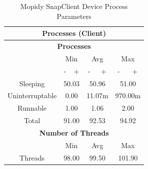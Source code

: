 \documentclass[11pt,a4paper,headinclude=false,footinclude=false]{scrreprt}
\begin{document}
\begin{table}[H]
\centering
    \begin{tabular}{||c|c|c|c|c|c|c||}
    \hline
    \multicolumn{7}{|c|}{\textbf{Processes (Client)}} \\
    \hline
    \multicolumn{7}{|c|}{\textbf{Processes}} \\
    \hline\hline
      & \multicolumn{2}{|c|}{Min} & \multicolumn{2}{|c|}{Avg} & \multicolumn{2}{|c|}{Max} \\
    \hline
      & - & + & - & + & - & + \\
    \hline
    Sleeping & \multicolumn{2}{|c|}{50.03} & \multicolumn{2}{|c|}{50.96} & \multicolumn{2}{|c|}{51.00} \\
    \hline
    Uninterruptable & \multicolumn{2}{|c|}{0.00} & \multicolumn{2}{|c|}{11.07m} & \multicolumn{2}{|c|}{970.00m} \\
    \hline
    Runnable & \multicolumn{2}{|c|}{1.00} & \multicolumn{2}{|c|}{1.06} & \multicolumn{2}{|c|}{2.00} \\
    \hline
    Total & \multicolumn{2}{|c|}{91.00} & \multicolumn{2}{|c|}{92.53} & \multicolumn{2}{|c|}{94.92} \\
    \hline\hline
    \multicolumn{7}{|c|}{\textbf{Number of Threads}} \\
    \hline\hline
      & \multicolumn{2}{|c|}{Min} & \multicolumn{2}{|c|}{Avg} & \multicolumn{2}{|c|}{Max} \\
    \hline
    Threads  & \multicolumn{2}{|c|}{98.00} & \multicolumn{2}{|c|}{99.50} & \multicolumn{2}{|c|}{101.90} \\
    \hline\hline
    \end{tabular}
    \caption{Mopidy SnapClient Device Process Parameters}
    \label{MopidyclientProcessTab}
\end{table}
\end{document}

